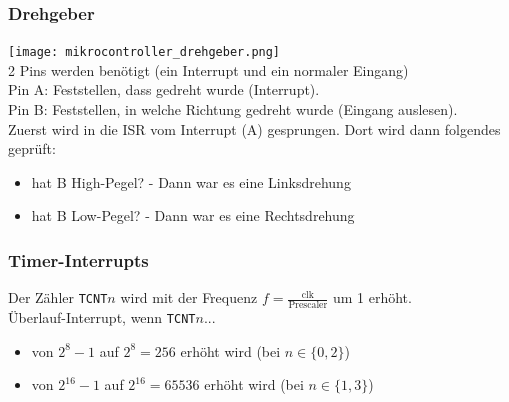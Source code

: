 \documentclass[ngerman, threecolumn, 8pt]{latex4ei/latex4ei_sheet}
\begin{document}
\subsubsection{Drehgeber}
\texttt{[image: mikrocontroller\_drehgeber.png]}\\
2 Pins werden benötigt (ein Interrupt und ein normaler Eingang)\\
Pin A: Feststellen, dass gedreht wurde (Interrupt).\\
Pin B: Feststellen, in welche Richtung gedreht wurde (Eingang auslesen).\\
Zuerst wird in die ISR vom Interrupt (A) gesprungen. Dort wird dann folgendes geprüft:
\begin{itemize}
\item hat B High-Pegel? - Dann war es eine Linksdrehung
\item hat B Low-Pegel? - Dann war es eine Rechtsdrehung
\end{itemize}
\begin{minipage}{\columnwidth}
\subsubsection{Timer-Interrupts}
Der Zähler \texttt{TCNT$n$} wird mit der Frequenz $f=\frac{\text{clk}}{\text{Prescaler}}$ um 1 erhöht. \\
Überlauf-Interrupt, wenn \texttt{TCNT$n$}...
\begin{itemize}
\item von $2^8-1$ auf $2^8=256$ erhöht wird (bei $n\in \{0,2\}$)
\item von $2^{16}-1$ auf $2^{16}=65536$ erhöht wird (bei $n\in \{1,3\}$)
\end{itemize}
\end{minipage}

\newpage
{}

%

\label{LastPage}
\end{document}
